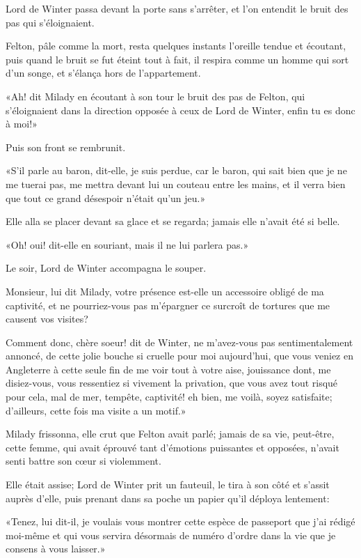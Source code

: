 Lord de Winter passa devant la porte sans s'arrêter, et l'on entendit le bruit des pas qui s'éloignaient. 

Felton, pâle comme la mort, resta quelques instants l'oreille tendue et écoutant, puis quand le bruit se fut éteint tout à fait, il respira comme un homme qui sort d'un songe, et s'élança hors de l'appartement. 

«Ah! dit Milady en écoutant à son tour le bruit des pas de Felton, qui s'éloignaient dans la direction opposée à ceux de Lord de Winter, enfin tu es donc à moi!» 

Puis son front se rembrunit. 

«S'il parle au baron, dit-elle, je suis perdue, car le baron, qui sait bien que je ne me tuerai pas, me mettra devant lui un couteau entre les mains, et il verra bien que tout ce grand désespoir n'était qu'un jeu.» 

Elle alla se placer devant sa glace et se regarda; jamais elle n'avait été si belle. 

«Oh! oui! dit-elle en souriant, mais il ne lui parlera pas.» 

Le soir, Lord de Winter accompagna le souper. 

\speak  Monsieur, lui dit Milady, votre présence est-elle un accessoire obligé de ma captivité, et ne pourriez-vous pas m'épargner ce surcroît de tortures que me causent vos visites? 

\speak  Comment donc, chère soeur! dit de Winter, ne m'avez-vous pas sentimentalement annoncé, de cette jolie bouche si cruelle pour moi aujourd'hui, que vous veniez en Angleterre à cette seule fin de me voir tout à votre aise, jouissance dont, me disiez-vous, vous ressentiez si vivement la privation, que vous avez tout risqué pour cela, mal de mer, tempête, captivité! eh bien, me voilà, soyez satisfaite; d'ailleurs, cette fois ma visite a un motif.» 

Milady frissonna, elle crut que Felton avait parlé; jamais de sa vie, peut-être, cette femme, qui avait éprouvé tant d'émotions puissantes et opposées, n'avait senti battre son cœur si violemment. 

Elle était assise; Lord de Winter prit un fauteuil, le tira à son côté et s'assit auprès d'elle, puis prenant dans sa poche un papier qu'il déploya lentement: 

«Tenez, lui dit-il, je voulais vous montrer cette espèce de passeport que j'ai rédigé moi-même et qui vous servira désormais de numéro d'ordre dans la vie que je consens à vous laisser.» 

